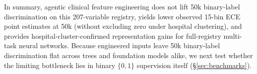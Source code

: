 In summary, agentic clinical feature engineering does not lift 50k binary-label discrimination on this 207-variable registry, yields lower observed 15-bin ECE point estimates at 50k (without excluding zero under hospital clustering), and provides hospital-cluster-confirmed representation gains for full-registry multi-task neural networks. Because engineered inputs leave 50k binary-label discrimination flat across trees and foundation models alike, we next test whether the limiting bottleneck lies in binary $\{0,1\}$ supervision itself (\S\ref{sec:benchmarks}).
